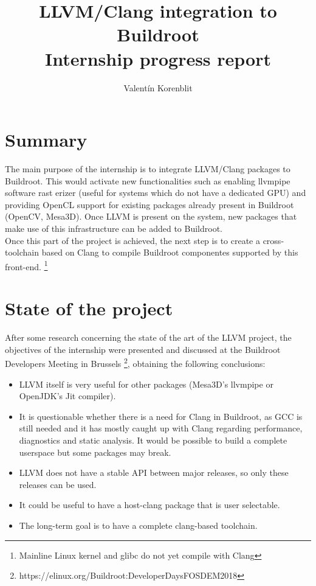 \documentclass[12pt,a4paper,oneside]{article}
\begin{document}
\author{Valent\'{i}n Korenblit}
\title{\vspace{-2cm} LLVM/Clang integration to Buildroot
\\ Internship progress report}
\maketitle

\section*{Summary}
The main purpose of the internship is to integrate LLVM/Clang packages to Buildroot.
This would activate new functionalities such as enabling llvmpipe software rast
erizer (useful for systems which do not have a dedicated GPU) and providing OpenCL
support for existing packages already present in Buildroot (OpenCV, Mesa3D). Once
LLVM is present on the system, new packages that make use of this infrastructure
can be added to Buildroot.\\
Once this part of the project is achieved, the next step is to create a cross-toolchain
based on Clang to compile Buildroot componentes supported by this front-end.
\footnote{Mainline Linux kernel and glibc do not yet compile with Clang}

\section*{State of the project}
After some research concerning the state of the art of the LLVM project, the objectives
of the internship were presented and discussed at the Buildroot Developers Meeting
in Brussels \footnote{https://elinux.org/Buildroot:DeveloperDaysFOSDEM2018}, obtaining
the following conclusions:
\begin{itemize}
  \item LLVM itself is very useful for other packages (Mesa3D's llvmpipe or OpenJDK's
        Jit compiler).
  \item It is questionable whether there is a need for Clang in Buildroot, as GCC
        is still needed and it has mostly caught up with Clang regarding performance,
        diagnostics and static analysis. It would be possible to build a complete
        userspace but some packages may break.
  \item LLVM does not have a stable API between major releases, so only these releases
        can be used.
  \item It could be useful to have a host-clang package that is user selectable.
  \item The long-term goal is to have a complete clang-based toolchain.
\end{itemize}
\end{document}

